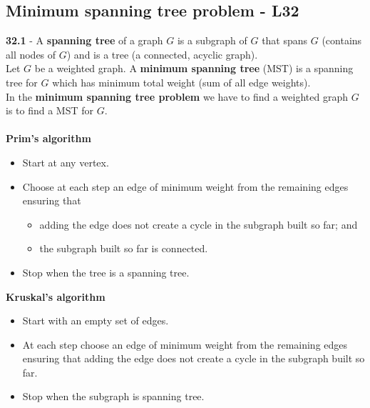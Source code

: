 \documentclass[a4paper]{article}
\begin{document}
\subsection*{Minimum spanning tree problem - L32}
\textbf{32.1} - A \textbf{spanning tree} of a graph $G$ is a subgraph of $G$ that spans $G$
(contains all nodes of $G$) and is a tree (a connected, acyclic graph).\\
Let $G$ be a weighted graph. A \textbf{minimum spanning tree} (MST) is a spanning tree
for $G$ which has minimum total weight (sum of all edge weights).\\
In the \textbf{minimum spanning tree problem} we have to find a weighted graph $G$ is to
find a MST for $G$.\\\\
\textbf{Prim's algorithm}
\begin{itemize}
    \item Start at any vertex.
    \item Choose at each step an edge of minimum weight from the remaining edges
    ensuring that
    \begin{itemize}
    \item adding the edge does not create a cycle in the subgraph built so far; and
    \item the subgraph built so far is connected.
    \end{itemize}
    \item Stop when the tree is a spanning tree.
\end{itemize}
\textbf{Kruskal's algorithm}
\begin{itemize}
    \item Start with an empty set of edges.
    \item At each step choose an edge of minimum weight from the remaining edges
    ensuring that adding the edge does not create a cycle in the subgraph built
    so far.
    \item Stop when the subgraph is spanning tree.
\end{itemize}
\end{document}
